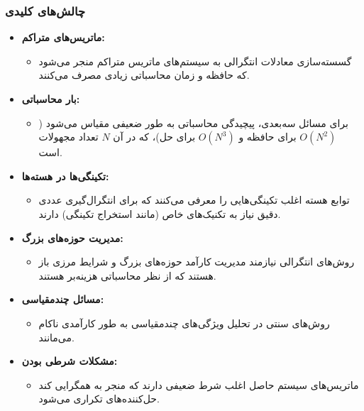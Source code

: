 \documentclass[12pt,a4paper]{article}
\begin{document}
\subsubsection{چالش‌های کلیدی}
\begin{itemize}
    \item \textbf{ماتریس‌های متراکم:}
          \begin{itemize}
              \item گسسته‌سازی معادلات انتگرالی به سیستم‌های ماتریس متراکم منجر می‌شود که حافظه و زمان محاسباتی زیادی مصرف می‌کنند.
          \end{itemize}
    \item \textbf{بار محاسباتی:}
          \begin{itemize}
              \item برای مسائل سه‌بعدی، پیچیدگی محاسباتی به طور ضعیفی مقیاس می‌شود (\(O(N^2)\) برای حافظه و \(O(N^3)\) برای حل)، که در آن \(N\) تعداد مجهولات است.
          \end{itemize}
    \item \textbf{تکینگی‌ها در هسته‌ها:}
          \begin{itemize}
              \item توابع هسته اغلب تکینگی‌هایی را معرفی می‌کنند که برای انتگرال‌گیری عددی دقیق نیاز به تکنیک‌های خاص (مانند استخراج تکینگی) دارند.
          \end{itemize}
    \item \textbf{مدیریت حوزه‌های بزرگ:}
          \begin{itemize}
              \item روش‌های انتگرالی نیازمند مدیریت کارآمد حوزه‌های بزرگ و شرایط مرزی باز هستند که از نظر محاسباتی هزینه‌بر هستند.
          \end{itemize}
    \item \textbf{مسائل چندمقیاسی:}
          \begin{itemize}
              \item روش‌های سنتی در تحلیل ویژگی‌های چندمقیاسی به طور کارآمدی ناکام می‌مانند.
          \end{itemize}
    \item \textbf{مشکلات شرطی بودن:}
          \begin{itemize}
              \item ماتریس‌های سیستم حاصل اغلب شرط ضعیفی دارند که منجر به همگرایی کند حل‌کننده‌های تکراری می‌شود.
          \end{itemize}
\end{itemize}
\end{document}
